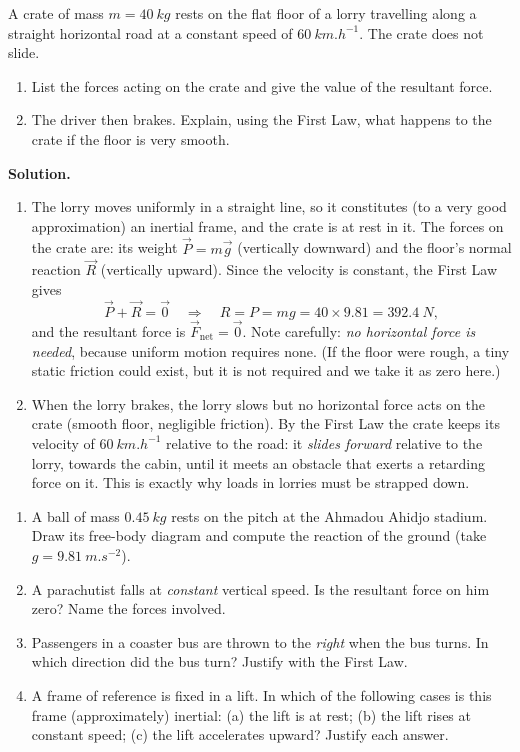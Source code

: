 \documentclass[11pt]{article}
\begin{document}
\begin{exoresolu}
A crate of mass $m = \SI{40}{kg}$ rests on the flat floor of a lorry travelling along a straight horizontal road at a constant speed of $\SI{60}{km.h^{-1}}$. The crate does not slide.
\begin{enumerate}
\item List the forces acting on the crate and give the value of the resultant force.
\item The driver then brakes. Explain, using the First Law, what happens to the crate if the floor is very smooth.
\end{enumerate}
\tcblower
\textbf{Solution.}
\begin{enumerate}
\item The lorry moves uniformly in a straight line, so it constitutes (to a very good approximation) an inertial frame, and the crate is at rest in it. The forces on the crate are: its weight $\vec{P}=m\vec{g}$ (vertically downward) and the floor's normal reaction $\vec{R}$ (vertically upward). Since the velocity is constant, the First Law gives
\[
\vec{P}+\vec{R}=\vec{0} \quad\Longrightarrow\quad R = P = mg = 40 \times 9.81 = \SI{392.4}{N},
\]
and the resultant force is $\vec{F}_{\text{net}}=\vec{0}$. Note carefully: \emph{no horizontal force is needed}, because uniform motion requires none. (If the floor were rough, a tiny static friction could exist, but it is not required and we take it as zero here.)
\item When the lorry brakes, the lorry slows but no horizontal force acts on the crate (smooth floor, negligible friction). By the First Law the crate keeps its velocity of $\SI{60}{km.h^{-1}}$ relative to the road: it \emph{slides forward} relative to the lorry, towards the cabin, until it meets an obstacle that exerts a retarding force on it. This is exactly why loads in lorries must be strapped down.
\end{enumerate}
\end{exoresolu}

\begin{exercice}
\begin{enumerate}
\item A ball of mass $\SI{0.45}{kg}$ rests on the pitch at the Ahmadou Ahidjo stadium. Draw its free-body diagram and compute the reaction of the ground (take $g=\SI{9.81}{m.s^{-2}}$).
\item A parachutist falls at \emph{constant} vertical speed. Is the resultant force on him zero? Name the forces involved.
\item Passengers in a coaster bus are thrown to the \emph{right} when the bus turns. In which direction did the bus turn? Justify with the First Law.
\item A frame of reference is fixed in a lift. In which of the following cases is this frame (approximately) inertial: (a) the lift is at rest; (b) the lift rises at constant speed; (c) the lift accelerates upward? Justify each answer.
\end{enumerate}
\end{exercice}
\end{document}
